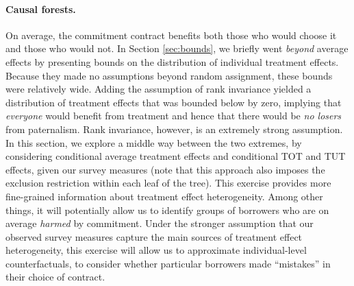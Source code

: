 \documentclass[oneside,11pt]{article}
\begin{document}
\paragraph{Causal forests.} 
On average, the commitment contract benefits both those who would choose it and those who would not.
In Section \ref{sec:bounds}, we briefly went \emph{beyond} average effects by presenting bounds on the distribution of individual treatment effects.
Because they made no assumptions beyond random assignment, these bounds were relatively wide.
Adding the assumption of rank invariance yielded a distribution of treatment effects that was bounded below by zero, implying that \emph{everyone} would benefit from treatment and hence that there would be \emph{no losers} from paternalism.
Rank invariance, however, is an extremely strong assumption.
In this section, we explore a middle way between the two extremes, by considering conditional average treatment effects and conditional TOT and TUT effects, given our survey measures (note that this approach also imposes the exclusion restriction within each leaf of the tree).
This exercise provides more fine-grained information about treatment effect heterogeneity.
Among other things, it will potentially allow us to identify groups of borrowers who are on average \emph{harmed} by commitment.
Under the stronger assumption that our observed survey measures capture the main sources of treatment effect heterogeneity, this exercise will allow us to approximate individual-level counterfactuals, to consider whether particular borrowers made ``mistakes'' in their choice of contract. 
\end{document}
